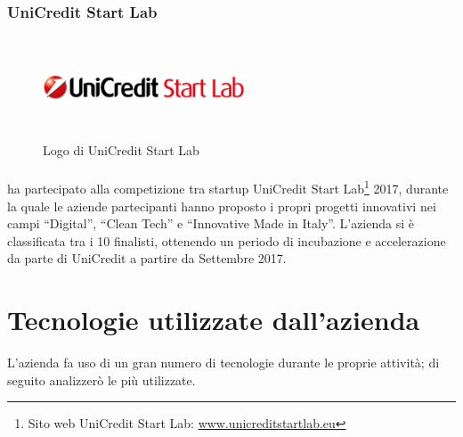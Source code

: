    \subsubsection{UniCredit Start Lab}
   \begin{figure}[H]
      \begin{center}
         \includegraphics[width=6cm,height=3cm,keepaspectratio]{immagini/unicreditstartlab-logo}
      \end{center}
      \caption{Logo di UniCredit Start Lab}\label{logounicreditstartlab}
   \end{figure}
   \paragraph*{} \nomeAzienda{} ha partecipato alla competizione tra startup UniCredit Start Lab\footnote{Sito web UniCredit Start Lab: \href{http://www.unicreditstartlab.eu}{www.unicreditstartlab.eu}} 2017, durante la quale le aziende partecipanti hanno proposto i propri progetti innovativi nei campi ``Digital'', ``Clean Tech'' e ``Innovative Made in Italy''. L'azienda si è classificata tra i 10 finalisti, ottenendo un periodo di incubazione e accelerazione da parte di UniCredit a partire da Settembre 2017.

\section{Tecnologie utilizzate dall'azienda}
L'azienda fa uso di un gran numero di tecnologie durante le proprie attività; di seguito analizzerò le più utilizzate.


